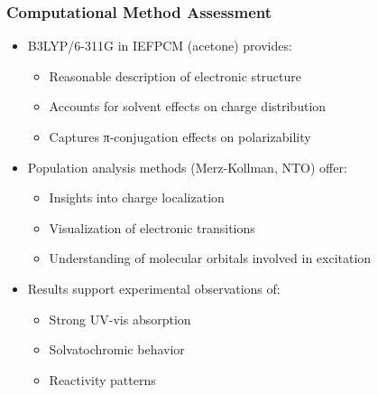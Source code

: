 \documentclass[aspectratio=169, 9pt]{beamer}
\begin{document}
\begin{frame}
\frametitle{Computational Method Assessment}
\begin{itemize}
\item B3LYP/6-311G in IEFPCM (acetone) provides:
  \begin{itemize}
  \item Reasonable description of electronic structure
  \item Accounts for solvent effects on charge distribution
  \item Captures π-conjugation effects on polarizability
  \end{itemize}
\item Population analysis methods (Merz-Kollman, NTO) offer:
  \begin{itemize}
  \item Insights into charge localization
  \item Visualization of electronic transitions
  \item Understanding of molecular orbitals involved in excitation
  \end{itemize}
\item Results support experimental observations of:
  \begin{itemize}
  \item Strong UV-vis absorption
  \item Solvatochromic behavior
  \item Reactivity patterns
  \end{itemize}
\end{itemize}
\end{frame}
\end{document}
